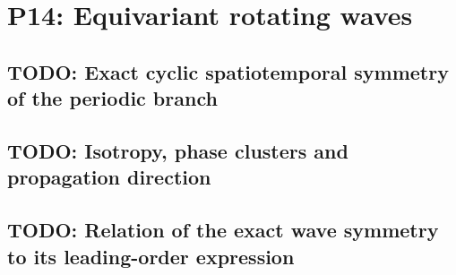 
\section{P14: Equivariant rotating waves}
\label{sec:P14}

\subsection{TODO: Exact cyclic spatiotemporal symmetry of the periodic branch}
\label{slot:P14-1}

\subsection{TODO: Isotropy, phase clusters and propagation direction}
\label{slot:P14-2}

\subsection{TODO: Relation of the exact wave symmetry to its leading-order expression}
\label{slot:P14-3}
